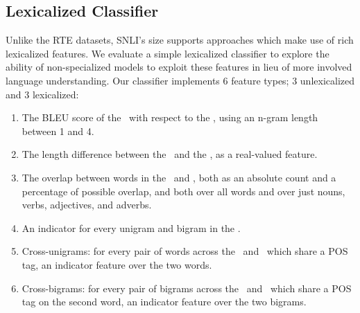 %
%
\subsection{Lexicalized Classifier}
Unlike the RTE datasets, SNLI's size supports approaches which make use of rich lexicalized features.
We evaluate a simple lexicalized classifier to explore the ability of non-specialized models to exploit these features in lieu of more involved language understanding.
Our classifier implements 6 feature types; 3 unlexicalized and 3 lexicalized:
\begin{enumerate}
\setlength\itemsep{-0.25em}
  \item The BLEU score of the \hypothesis\ with respect
  to the \premise, using an n-gram length between 1 and 4.

  \item The length difference between the \hypothesis\ and the \premise, as a real-valued
  feature.

  \item The overlap between words in the \premise\ and \hypothesis,
  both as an absolute count and a percentage of possible overlap, and both over 
  all words and over just nouns, verbs, adjectives, 
  and adverbs.
  
  \item\label{lst:ngram} An indicator for every unigram and bigram in the \hypothesis.

  \item\label{lst:unigram} Cross-unigrams: for every pair of words across the \premise\ and \hypothesis\ which share a 
  POS tag, an indicator feature over the two words.
  
  \item\label{lst:bigram} Cross-bigrams: for every pair of bigrams across the \premise\ and \hypothesis\ which share a 
  POS tag on the second word, an indicator feature over the two bigrams.
\end{enumerate}

%
%


